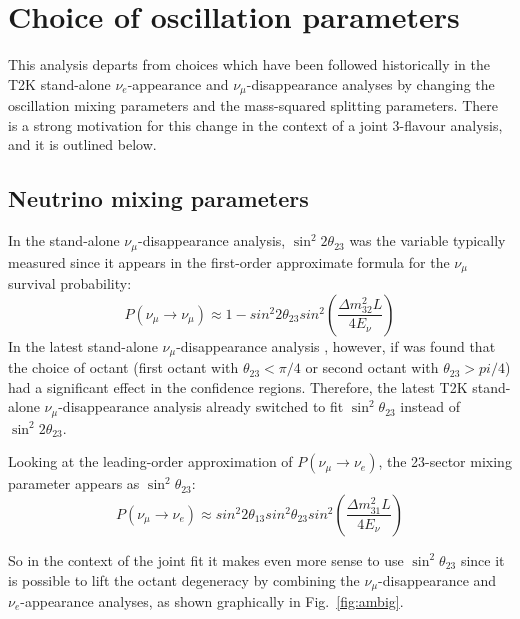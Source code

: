 
\section {Choice of oscillation parameters}
\label{sec:osc_params_choice}


This analysis departs from choices which have been followed historically in the T2K stand-alone $\nu_{e}$-appearance and 
$\nu_{\mu}$-disappearance analyses by changing the oscillation mixing parameters and the mass-squared splitting parameters.
There is a strong motivation for this change in the context of a joint 3-flavour analysis, and it is outlined below.

\subsection* {Neutrino mixing parameters}

In the stand-alone $\nu_{\mu}$-disappearance analysis, $\sin^{2}2\theta_{23}$ was the variable typically measured since it appears in the first-order approximate formula for the $\nu_{\mu}$ survival probability:
\begin{equation}
P(\nu_{\mu}\rightarrow\nu_{\mu}) \approx 1 - sin^{2}2\theta_{23} sin^{2} \left(  \frac{\Delta m_{32}^{2} L}{4E_{\nu}}\right)
\end{equation}
In the latest stand-alone $\nu_{\mu}$-disappearance analysis \cite{OurRun1234DisappAnalysis3Flavour}, however, if was found that the choice of octant (first octant with $\theta_{23} < \pi/4$ or second octant with $\theta_{23}>pi/4$) had a significant effect in the confidence regions. Therefore, the latest T2K stand-alone $\nu_{\mu}$-disappearance analysis already switched to fit $\sin^{2}\theta_{23}$ instead of $\sin^{2}2\theta_{23}$.

Looking at the leading-order approximation of $P(\nu_{\mu}\rightarrow\nu_{e})$, the 23-sector mixing parameter appears as $\sin^{2}\theta_{23}$:
\begin{equation}
P(\nu_{\mu}\rightarrow\nu_{e}) \approx sin^{2}2\theta_{13}sin^{2}\theta_{23} sin^{2} \left(  \frac{\Delta m_{31}^{2} L}{4E_{\nu}}\right)
\label{eq:pnumunue}
\end{equation}

So in the context of the joint fit it makes even more sense to use $\sin^{2}\theta_{23}$ since it is possible to lift the octant degeneracy by combining the $\nu_{\mu}$-disappearance and $\nu_{e}$-appearance analyses, as shown 
graphically in Fig.\ \ref{fig:ambig}. 

